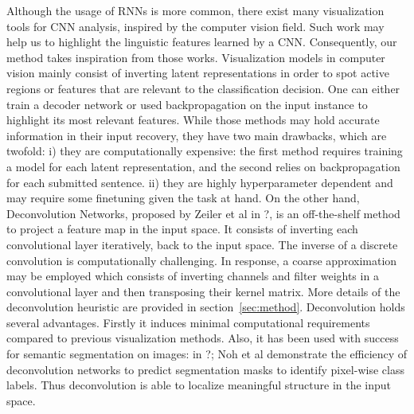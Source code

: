 Although the usage of RNNs is more common, there exist many visualization tools for CNN analysis, 
inspired by the computer vision field. Such work may help us to highlight the linguistic features learned by a 
CNN. Consequently, our method takes inspiration from those works. Visualization models in computer vision mainly consist 
of inverting latent representations in order to spot active regions or features that are relevant to the classification decision.
One can either train a decoder network or used backpropagation on the input instance to highlight its most relevant features. 
While those methods may hold accurate information in their input recovery, they have two main drawbacks, which are twofold: 
i) they are computationally expensive: the first method requires training a model for each latent representation, and the second relies 
on backpropagation for each submitted sentence. ii) they are highly hyperparameter dependent and may require some finetuning given the task at hand.
On the other hand, Deconvolution Networks, proposed by Zeiler et al in ?, is an off-the-shelf method to project a feature map in the input 
space. It consists of inverting each convolutional layer iteratively, back to the input space. The inverse of a discrete convolution is 
computationally challenging. In response, a coarse approximation may be employed which consists of inverting channels and filter weights 
in a convolutional layer and then transposing their kernel matrix. More details of the deconvolution heuristic are provided in section~\ref{sec:method}.
Deconvolution holds several advantages. Firstly it induces minimal computational requirements compared to previous visualization methods. 
Also, it has been used with success for semantic segmentation on images: in ?; Noh et al demonstrate the efficiency of deconvolution networks 
to predict segmentation masks to identify pixel-wise class labels. Thus deconvolution is able to localize meaningful structure in the input space.
